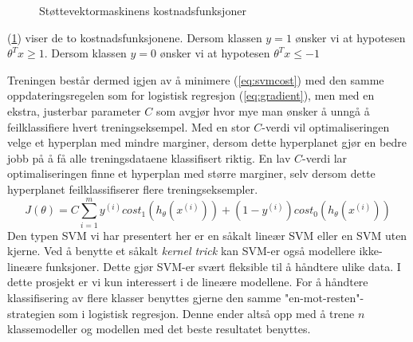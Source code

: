 \begin{figure}[h!]
\begin{subfigure}{0.5\textwidth}
\centering
{}
\end{subfigure}
\begin{subfigure}{0.5\textwidth}
\centering
{}
\end{subfigure}
\caption{Støttevektormaskinens kostnadsfunksjoner}
\label{figure:svmcost}
\end{figure}
(\ref{figure:svmcost}) viser de to kostnadsfunksjonene. Dersom klassen $y=1$ ønsker vi at hypotesen $\theta^{T}x \geq 1$. Dersom klassen $y=0$ ønsker vi at hypotesen $\theta^{T}x \leq -1$

Treningen består dermed igjen av å minimere (\ref{eq:svmcost}) med den samme oppdateringsregelen som for logistisk regresjon (\ref{eq:gradient}), men med en ekstra, justerbar parameter $C$ som avgjør hvor mye man ønsker å unngå å feilklassifiere hvert treningseksempel. Med en stor $C$-verdi vil optimaliseringen velge et hyperplan med mindre marginer, dersom dette hyperplanet gjør en bedre jobb på å få alle treningsdataene klassifisert riktig. En lav $C$-verdi lar optimaliseringen finne et hyperplan med større marginer, selv dersom dette hyperplanet feilklassifiserer flere treningseksempler.
\begin{equation}
J(\theta) = 
    C \sum_{i=1}^{m} y^{(i)}cost_1(h_\theta(x^{(i)})) + (1-y^{(i)})cost_0(h_\theta(x^{(i)}))
\label{eq:svmcost}
\end{equation}
Den typen SVM vi har presentert her er en såkalt lineær SVM eller en SVM uten kjerne. Ved å benytte et såkalt \emph{kernel trick} kan SVM-er også modellere ikke-lineære funksjoner. Dette gjør SVM-er svært fleksible til å håndtere ulike data. I dette prosjekt er vi kun interessert i de lineære modellene. For å håndtere klassifisering av flere klasser benyttes gjerne den samme "en-mot-resten"-strategien som i logistisk regresjon. Denne ender altså opp med å trene $n$ klassemodeller og modellen med det beste resultatet benyttes.\\

